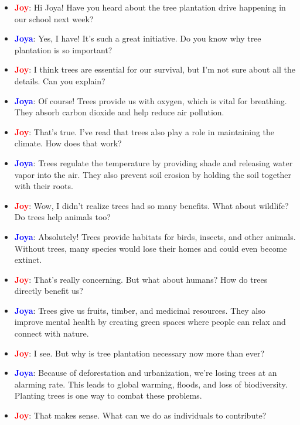 \documentclass{article}
\begin{document}
\begin{itemize}
    \item \textbf{\textcolor{red}{Joy}}: Hi Joya! Have you heard about the tree plantation drive happening in our school next week?
    \item \textbf{\textcolor{blue}{Joya}}: Yes, I have! It’s such a great initiative. Do you know why tree plantation is so important?
    \item \textbf{\textcolor{red}{Joy}}: I think trees are essential for our survival, but I’m not sure about all the details. Can you explain?
    \item \textbf{\textcolor{blue}{Joya}}: Of course! Trees provide us with oxygen, which is vital for breathing. They absorb carbon dioxide and help reduce air pollution.
    \item \textbf{\textcolor{red}{Joy}}: That’s true. I’ve read that trees also play a role in maintaining the climate. How does that work?
    \item \textbf{\textcolor{blue}{Joya}}: Trees regulate the temperature by providing shade and releasing water vapor into the air. They also prevent soil erosion by holding the soil together with their roots.
    \item \textbf{\textcolor{red}{Joy}}: Wow, I didn’t realize trees had so many benefits. What about wildlife? Do trees help animals too?
    \item \textbf{\textcolor{blue}{Joya}}: Absolutely! Trees provide habitats for birds, insects, and other animals. Without trees, many species would lose their homes and could even become extinct.
    \item \textbf{\textcolor{red}{Joy}}: That’s really concerning. But what about humans? How do trees directly benefit us?
    \item \textbf{\textcolor{blue}{Joya}}: Trees give us fruits, timber, and medicinal resources. They also improve mental health by creating green spaces where people can relax and connect with nature.
    \item \textbf{\textcolor{red}{Joy}}: I see. But why is tree plantation necessary now more than ever?
    \item \textbf{\textcolor{blue}{Joya}}: Because of deforestation and urbanization, we’re losing trees at an alarming rate. This leads to global warming, floods, and loss of biodiversity. Planting trees is one way to combat these problems.
    \item \textbf{\textcolor{red}{Joy}}: That makes sense. What can we do as individuals to contribute?

\end{itemize}
\end{document}
